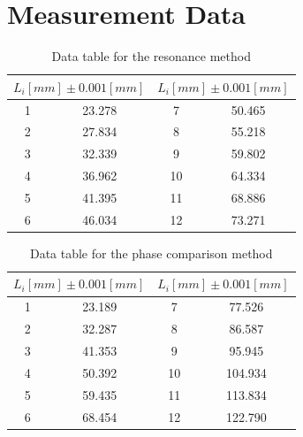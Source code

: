 \documentclass[12pt,a4paper]{article}
\begin{document}
\section{Measurement Data}
\begin{table}[H]
    \centering
    \begin{tabular}{|c|c||c|c||}
        \hline
        \multicolumn{2}{|c||}{$L_i[mm]\pm 0.001[mm]$} & \multicolumn{2}{c||}{$L_i[mm]\pm 0.001[mm]$}\\
        \hline
        1 & 23.278 & 7 & 50.465 \\
        \hline
        2 & 27.834 & 8 & 55.218 \\
        \hline
        3 & 32.339 & 9 & 59.802 \\
        \hline
        4 & 36.962 & 10 & 64.334 \\
        \hline
        5 & 41.395 & 11 & 68.886 \\
        \hline
        6 & 46.034 & 12 & 73.271 \\
        \hline
    \end{tabular}
    \caption{Data table for the resonance method}
\end{table}

\begin{table}[H]
    \centering
    \begin{tabular}{|c|c||c|c||}
        \hline
        \multicolumn{2}{|c||}{$L_i[mm]\pm 0.001[mm]$} & \multicolumn{2}{c||}{$L_i[mm]\pm 0.001[mm]$}\\
        \hline
        1 & 23.189 & 7 & 77.526 \\
        \hline
        2 & 32.287 & 8 & 86.587 \\
        \hline
        3 & 41.353 & 9 & 95.945 \\
        \hline
        4 & 50.392 & 10 & 104.934 \\
        \hline
        5 & 59.435 & 11 & 113.834 \\
        \hline
        6 & 68.454 & 12 & 122.790 \\
        \hline
    \end{tabular}
    \caption{Data table for the phase comparison method}
\end{table}
\end{document}
